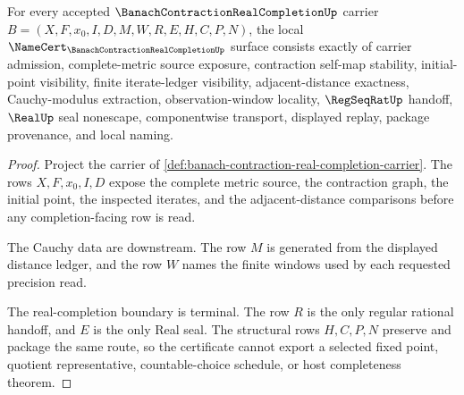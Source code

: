 \begin{theorem}
\label{thm:banach-contraction-real-completion-obligations}
For every accepted $\BanachContractionRealCompletionUp$ carrier $B=(X,F,x_0,I,D,M,W,R,E,H,C,P,N)$, the local $\NameCert_{\BanachContractionRealCompletionUp}$ surface consists exactly of carrier admission, complete-metric source exposure, contraction self-map stability, initial-point visibility, finite iterate-ledger visibility, adjacent-distance exactness, Cauchy-modulus extraction, observation-window locality, $\RegSeqRatUp$ handoff, $\RealUp$ seal nonescape, componentwise transport, displayed replay, package provenance, and local naming.
\end{theorem}
\begin{proof}
Project the carrier of \autoref{def:banach-contraction-real-completion-carrier}. The rows $X,F,x_0,I,D$ expose the complete metric source, the contraction graph, the initial point, the inspected iterates, and the adjacent-distance comparisons before any completion-facing row is read.

The Cauchy data are downstream. The row $M$ is generated from the displayed distance ledger, and the row $W$ names the finite windows used by each requested precision read.

The real-completion boundary is terminal. The row $R$ is the only regular rational handoff, and $E$ is the only Real seal. The structural rows $H,C,P,N$ preserve and package the same route, so the certificate cannot export a selected fixed point, quotient representative, countable-choice schedule, or host completeness theorem.
\end{proof}

